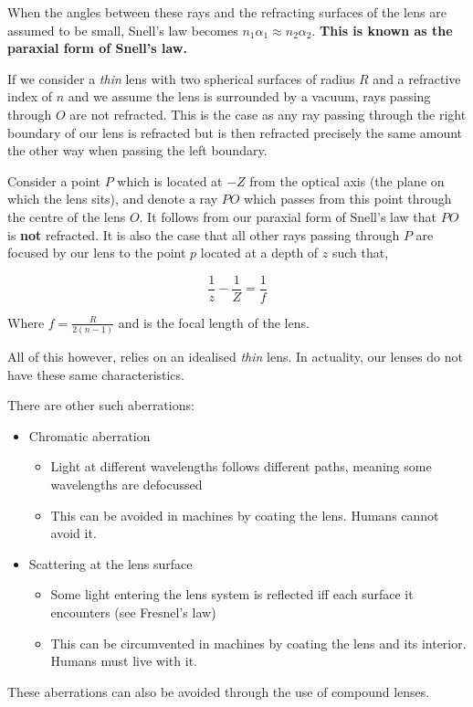 \documentclass{article}
\begin{document}
When the angles between these rays and the refracting surfaces of the lens are assumed to be small, Snell's law becomes $n_{1}\alpha_{1} \approx n_{2}\alpha_{2}$. \textbf{This is known as the paraxial form of Snell's law.}

If we consider a \textit{thin} lens with two spherical surfaces of radius $R$ and a refractive index of $n$ and we assume the lens is surrounded by a vacuum, rays passing through $O$ are not refracted. This is the case as any ray passing through the right boundary of our lens is refracted but is then refracted precisely the same amount the other way when passing the left boundary.

Consider a point $P$ which is located at $-Z$ from the optical axis (the plane on which the lens sits), and denote a ray $PO$ which passes from this point through the centre of the lens $O$. It follows from our paraxial form of Snell's law that $PO$ is \textbf{not} refracted. It is also the case that all other rays passing through $P$ are focused by our lens to the point $p$ located at a depth of $z$ such that,

\[
  \frac{1}{z} - \frac{1}{Z} = \frac{1}{f}
\]

Where $f= \frac{R}{2(n-1)}$ and is the focal length of the lens.

All of this however, relies on an idealised \textit{thin} lens. In actuality, our lenses do not have these same characteristics.


There are other such aberrations:

\begin{itemize}
  \item Chromatic aberration
        \begin{itemize}
          \item   Light at different wavelengths follows different paths, meaning some wavelengths are defocussed
                \item This can be avoided in machines by coating the lens. Humans cannot avoid it.
        \end{itemize}
  \item Scattering at the lens surface

        \begin{itemize}
          \item Some light entering the lens system is reflected iff each surface it encounters (see Fresnel's law)
          \item This can be circumvented in machines by coating the lens and its interior. Humans must live with it.
        \end{itemize}
\end{itemize}

These aberrations can also be avoided through the use of compound lenses.
\end{document}
